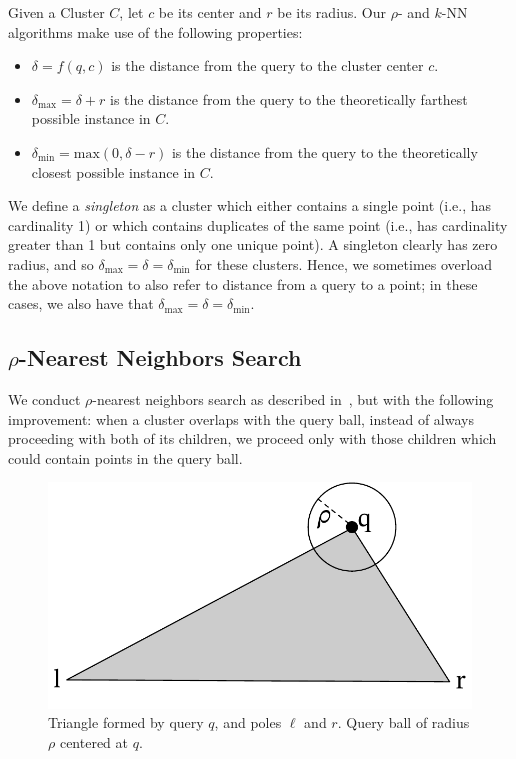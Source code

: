 Given a Cluster $C$, let $c$ be its center and $r$ be its radius. Our $\rho$- and $k$-NN algorithms make use of the following properties:

\begin{itemize}
    \item $\delta = f(q, c)$ is the distance from the query to the cluster center $c$.
    \item $\delta_{\max} = \delta + r$ is the distance from the query to the theoretically farthest possible instance in $C$.
    \item $\delta_{\min} = \text{max}(0, \delta - r)$ is the distance from the query to the theoretically closest possible instance in $C$.
\end{itemize}

We define a \emph{singleton} as a cluster which either contains a single point (i.e., has cardinality 1) or which contains 
duplicates of the same point (i.e., has cardinality greater than 1 but contains only one unique point).
A singleton clearly has zero radius, and so $\delta_{\max} = \delta = \delta_{\min}$ for these clusters.
Hence, we sometimes overload the above notation to also refer to distance from a query to a point;
in these cases, we also have that $\delta_{\max} = \delta = \delta_{\min}$.


\subsection{\texorpdfstring{$\rho$}{p}-Nearest Neighbors Search}
\label{subsec:methods:rnn-search}

We conduct $\rho$-nearest neighbors search as described in~\cite{ishaq2019clustered}, but with the following improvement:
when a cluster overlaps with the query ball, instead of always proceeding with both of its children, we proceed only with those children which could contain points in the query ball. 


\begin{figure}[ht!]
    \centering
    \includegraphics[scale=0.5]{images/geometry/overlapping-children-1.pdf}
    \caption{
        Triangle formed by query $q$, and poles $\ell$ and $r$. Query ball of radius $\rho$ centered at $q$. 
    }
    \label{fig:methods:overlapping-children-1}
\end{figure}


